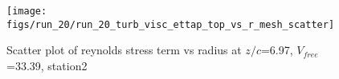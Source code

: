 \begin{figure}[H]
\centering
\texttt{[image: figs/run\_20/run\_20\_turb\_visc\_ettap\_top\_vs\_r\_mesh\_scatter]}
\caption{Scatter plot of reynolds stress term vs radius at $z/c$=6.97, $V_{free}$=33.39, station2}
\label{fig:run_20_turb_visc_ettap_top_vs_r_mesh_scatter}
\end{figure}


